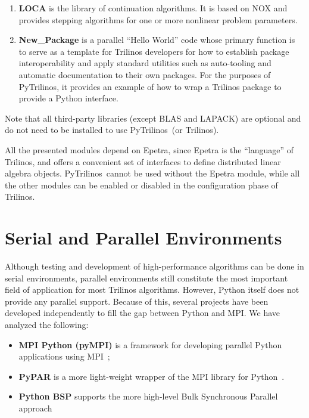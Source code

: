 \documentclass[acmtocl]{acmtrans2m}
\newcommand{\PyTrilinos}{{PyTrilinos}}
\begin{document}
\begin{enumerate}
\item {\bf LOCA} is the library of continuation algorithms.  It is
  based on NOX and provides stepping algorithms for one or more
  nonlinear problem parameters.

\item {\bf New\_Package} is a parallel ``Hello World'' code whose
  primary function is to serve as a template for Trilinos developers
  for how to establish package interoperability and apply standard
  utilities such as auto-tooling and automatic documentation to their
  own packages.  For the purposes of \PyTrilinos, it provides an
  example of how to wrap a Trilinos package to provide a Python
  interface.

\end{enumerate}

Note that all third-party libraries (except BLAS and LAPACK) are
optional and do not need to be installed to use \PyTrilinos\ (or
Trilinos).

All the presented modules depend on Epetra, since Epetra is the
``language'' of Trilinos, and offers a convenient set of interfaces to
define distributed linear algebra objects.  \PyTrilinos\ cannot be
used without the Epetra module, while all the other modules can be
enabled or disabled in the configuration phase of Trilinos.

\section{Serial and Parallel Environments}
\label{sec:serial}

Although testing and development of high-performance algorithms can be
done in serial environments, parallel environments still constitute
the most important field of application for most Trilinos algorithms.
However, Python itself does not provide any parallel support.  Because
of this, several projects have been developed independently to fill
the gap between Python and MPI.  We have analyzed the following:

\begin{itemize}

\item {\bf MPI Python (pyMPI)} is a framework for developing parallel
  Python applications using MPI~\cite{MPI-Python};

\item {\bf PyPAR} is a more light-weight wrapper of the MPI library
  for Python~\cite{pypar}.

\item {\bf Python BSP} supports the more high-level Bulk Synchronous
  Parallel approach~\cite{bsp}

\end{itemize}
\end{document}
